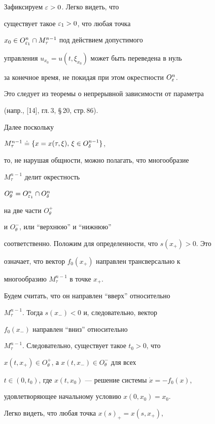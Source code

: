 \begin{pf}


Зафиксируем $\varepsilon>0$. Легко видеть, что


существует такое $\varepsilon_1>0$, что любая точка


$x_0\in O_{\varepsilon_1}^n\cap M^{n-1}_{\tau}$ под действием допустимого


управления $u_{x_0}=u(t,\xi_{x_0})$ может быть переведена в нуль


за конечное время, не покидая при этом окрестности $O_{\varepsilon}^n$.


Это следует из теоремы о непрерывной зависимости от параметра


(напр., [14], гл.\,3, \S\,20, стр.\,86).





Далее поскольку


$M^{n-1}_{\tau}\doteq\{x=x(\tau,\xi),\,\xi\in O^{n-1}_{\delta}\}$,


то, не нарушая общности, можно полагать, что многообразие


$M^{n-1}_{\tau}$ делит окрестность


$O_{\theta}^n=O_{\varepsilon_1}^n\cap O_{\delta}^n$


на две части $O_{\theta}^{+}$


и $O_{\theta}^{-}$, или ``верхнюю'' и ``нижнюю''


соответственно. Положим для определенности, что $s(x_{+})>0$.  Это


означает, что вектор $f_0(x_{+})$ направлен трансверсально к


многообразию $M^{n-1}_{\tau}$ в точке $x_{+}$.


Будем считать, что он направлен ``вверх'' относительно


$M^{n-1}_{\tau}$. Тогда $s(x_{-})<0$ и, следовательно, вектор


$f_0(x_{-})$ направлен ``вниз'' относительно


$M^{n-1}_{\tau}$.  Следовательно, существует такое $t_0>0$, что


$x(t,x_{+})\in O_{\theta}^{+}$, а $x(t,x_{-})\in O_{\theta}^{-}$ для всех


$t\in(0,t_0)$, где $x(t,x_0)$ --- решение системы $\Dot x = -f_0(x)$,


удовлетворяющее начальному условию $x(0,x_0)=x_0$.





Легко видеть, что любая точка $x(s)_{+}=x(s,x_{+})$,



\end{pf}
